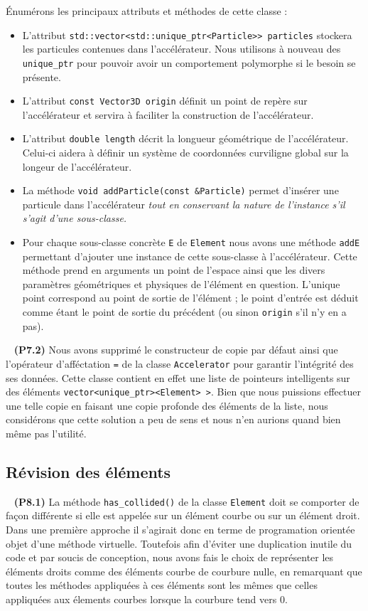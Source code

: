 \documentclass[12pt, letterpaper, twoside]{article}
\newcommand{\T}[1]{\texttt{#1}}
\begin{document}
Énumérons les principaux attributs et méthodes de cette classe :
\begin{itemize}
	\item L'attribut \T{std::vector<std::unique\_ptr<Particle>> particles} stockera les particules contenues dans l'accélérateur. Nous utilisons à nouveau des \T{unique\_ptr} pour pouvoir avoir un comportement polymorphe si le besoin se présente.
	\item L'attribut \T{const Vector3D origin} définit un point de repère sur l'accélérateur et servira à faciliter la construction de l'accélérateur.
	\item L'attribut \T{double length} décrit la longueur géométrique de l'accélérateur. Celui-ci aidera à définir un système de coordonnées curviligne global sur la longeur de l'accélérateur.
	\item La méthode \T{void addParticle(const \&Particle)} permet d'insérer une particule dans l'accélérateur \textit{tout en conservant la nature de l'instance s'il s'agit d'une sous-classe.}
	\item Pour chaque sous-classe concrète \T{E} de \T{Element} nous avons une méthode \T{addE} permettant d'ajouter une instance de cette sous-classe à l'accélérateur. Cette méthode prend en arguments un point de l'espace ainsi que les divers paramètres géométriques et physiques de l'élément en question. L'unique point correspond au point de sortie de l'élément ; le point d'entrée est déduit comme étant le point de sortie du précédent (ou sinon \T{origin} s'il n'y en a pas).
\end{itemize}

\ \linebreak
\noindent \textbf{(P7.2)} Nous avons supprimé le constructeur de copie par défaut ainsi que l'opérateur d'afféctation \T{=} de la classe \T{Accelerator} pour garantir l'intégrité des ses données. Cette classe contient en effet une liste de pointeurs intelligents sur des éléments \T{vector<unique\_ptr><Element> >}. Bien que nous puissions effectuer une telle copie en faisant une copie profonde des éléments de la liste, nous considérons que cette solution a peu de sens et nous n'en aurions quand bien même pas l'utilité.

\subsection{Révision des éléments}

\ \linebreak
\noindent \textbf{(P8.1)} La méthode \T{has\_collided()} de la classe \T{Element} doit se comporter de façon différente si elle est appelée sur un élément courbe ou sur un élément droit. Dans une première approche il s'agirait donc en terme de programation orientée objet d'une méthode virtuelle. Toutefois afin d'éviter une duplication inutile du code et par soucis de conception, nous avons fais le choix de représenter les éléments droits comme des éléments courbe de courbure nulle, en remarquant que toutes les méthodes appliquées à ces éléments sont les mêmes que celles appliquées aux élements courbes lorsque la courbure tend vers 0.
\end{document}
